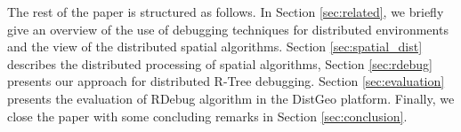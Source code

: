 The rest of the paper is structured as follows. In Section \ref{sec:related}, we briefly give an overview of the use of debugging techniques for distributed environments and the view of the distributed spatial algorithms. 
Section \ref{sec:spatial_dist} describes the distributed processing of spatial algorithms, 
Section \ref{sec:rdebug} presents our approach for distributed R-Tree debugging. Section \ref{sec:evaluation} presents the evaluation of RDebug algorithm in the DistGeo platform.
Finally, we close the paper with some concluding remarks in Section \ref{sec:conclusion}.
